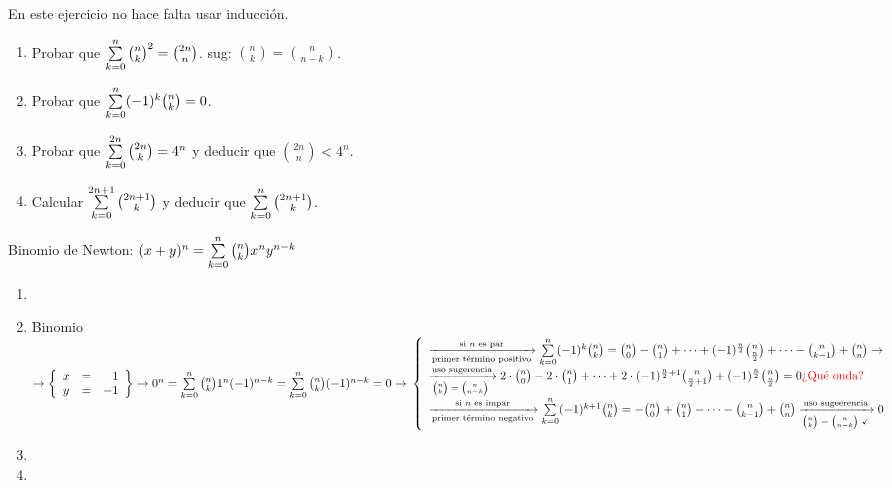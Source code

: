 \documentclass[12pt,a4paper, spanish]{article}
\begin{document}
\ejercicio

\ejercicio

\ejercicio

\ejercicio

\ejercicio
En este ejercicio no hace falta usar inducción.
\begin{enumerate}[label=\roman*)]
	\item Probar que $\sum\limits_{k = 0}^{n} \binom{n}{k}^2 = \binom{2n}{n}$. \qquad sug: $\binom{n}{k} = \binom{n}{n-k}$.
	\item Probar que $\sum\limits_{k = 0}^{n} (-1)^k \binom{n}{k} = 0$.
	\item Probar que $\sum\limits_{k = 0}^{2n} \binom{2n}{k} = 4^n$ y deducir que $\binom{2n}{n} < 4^n$.
	\item Calcular $\sum\limits_{k = 0}^{2n+1} \binom{2n+1}{k}$ y deducir que $\sum\limits_{k=0}^{n} \binom{2n+1}{k}$.
\end{enumerate}

\separadorCorto

Binomio de Newton: $(x + y)^n = \sum\limits_{k=0}^{n} \binom{n}{k} x^n y^{n-k}$
\begin{enumerate}[label=\roman*)]
	\item

	\item  Binomio $\to
		      \llaves{lcr}{
			      x &=& 1\\
			      y &=& -1
		      } \to 0^n = \sumatoria{k=0}{n} \binom{n}{k} 1^n (-1)^{n-k}  = \sumatoria{k=0}{n} \binom{n}{k} (-1)^{n-k} = 0 \to\\
		      \llave{l}{
		      \flecha{si $n$ es par}[primer término positivo] \sumatoria{k=0}{n} (-1)^k  \binom{n}{k} =
		      \binom{n}{0} - \binom{n}{1} + \dots + (-1)^\frac{n}{2} \binom{n}{\frac{n}{2}} +\dots  - \binom{n}{k-1} + \binom{n}{n} \to\\
		      \flecha{uso sugerencia}[$\binom{n}{k} = \binom{n}{n-k}$ ]
		      2\cdot\binom{n}{0} - 2 \cdot \binom{n}{1} + \dots + 2 \cdot (-1)^{\frac{n}{2} + 1} \binom{n}{\frac{n}{2} + 1} + (-1)^\frac{n}{2} \binom{n}{\frac{n}{2}} = 0 \red{¿Qué onda?}\\

		      \flecha{si $n$ es impar}[primer término negativo] \sumatoria{k=0}{n} (-1)^{k+1} \binom{n}{k} =
		      - \binom{n}{0} + \binom{n}{1} - \dots  - \binom{n}{k-1} + \binom{n}{n} \flecha{uso sugeerencia}[$\binom{n}{k} = \binom{n}{n-k}$ \checkmark] 0
		      }$

	\item \hacer
	\item \hacer
\end{enumerate}
\end{document}
